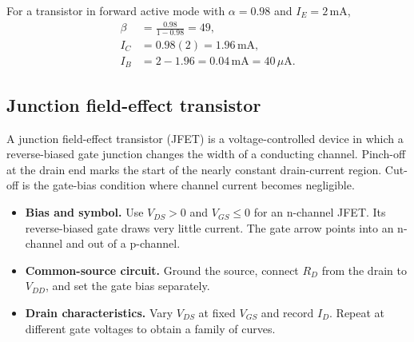 \documentclass[12pt,a4paper]{article}
\begin{document}
\begin{tcolorbox}[examplebox,title={Convert BJT current gains}]
For a transistor in forward active mode with \(\alpha=0.98\) and \(I_E=2\,\mathrm{mA}\),
\[
\begin{aligned}
\beta&=\frac{0.98}{1-0.98}=49,\\
I_C&=0.98(2)=1.96\,\mathrm{mA},\\
I_B&=2-1.96=0.04\,\mathrm{mA}=40\,\mu\mathrm A.
\end{aligned}
\]
\end{tcolorbox}

\subsection{Junction field-effect transistor}
\begin{tcolorbox}[defbox,title={JFET and pinch-off}]
A junction field-effect transistor (JFET) is a voltage-controlled device in which a reverse-biased gate junction changes the width of a conducting channel. Pinch-off at the drain end marks the start of the nearly constant drain-current region. Cut-off is the gate-bias condition where channel current becomes negligible.
\end{tcolorbox}

\begin{itemize}[leftmargin=*, itemsep=3pt, topsep=4pt]
  \item \textbf{Bias and symbol.} Use \(V_{DS}>0\) and \(V_{GS}\le 0\) for an n-channel JFET. Its reverse-biased gate draws very little current. The gate arrow points into an n-channel and out of a p-channel.
  \item \textbf{Common-source circuit.} Ground the source, connect \(R_D\) from the drain to \(V_{DD}\), and set the gate bias separately.
  \item \textbf{Drain characteristics.} Vary \(V_{DS}\) at fixed \(V_{GS}\) and record \(I_D\). Repeat at different gate voltages to obtain a family of curves.
\end{itemize}

\begin{tcolorbox}[tikzbox,title={N-channel JFET in a common-source circuit},unbreakable]
\centering
{}
\end{tcolorbox}
\end{document}
